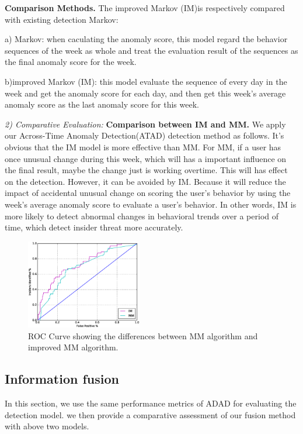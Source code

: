 \documentclass[conference]{IEEEtran}
\begin{document}
\textbf{Comparison Methods.}
The improved Markov (IM)is respectively compared with existing detection Markov:

a) Markov: when caculating the anomaly score, this model regard the behavior sequences of the week as whole and treat the evaluation result of the sequences as the final anomaly score for the week.

b)improved Markov (IM): this model evaluate the sequence of every day in the week and get the anomaly score for each day, and then get this week's average anomaly score as the last anomaly score for this week.

\emph{2) Comparative Evaluation:} 
\textbf{Comparison between IM and MM.}
We apply our Across-Time Anomaly Detection(ATAD) detection method as follows. It's obvious that the IM model is more effective than MM. For MM, if a user has once unusual change during this week, which will has a important influence on the final result, maybe the change just is working overtime. This will has effect on the detection. However, it can be avoided by IM. Because it will reduce the impact of accidental unusual change on scoring the user's behavior by using the week's average anomaly score to evaluate a user's behavior.
In other words, IM is more likely to detect abnormal changes in behavioral trends over a period of time, which detect insider threat more accurately. 



\begin{figure}[htb]
\centerline{\includegraphics[width = 0.45\textwidth]{figure/figure7.eps}}
\caption{ROC Curve showing the differences between MM algorithm and improved MM algorithm.}
\label{fig}
\end{figure}


\subsection{Information fusion}
In this section, we use the same performance metrics of ADAD for evaluating the detection model.
we then provide a comparative assessment of our fusion method with above two models.
\end{document}
